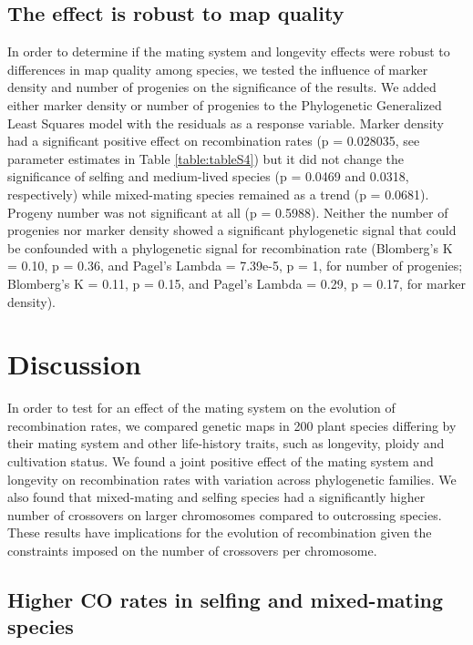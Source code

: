 \documentclass{article}
\begin{document}
\subsection*{The effect is robust to map quality}


In order to determine if the mating system and longevity effects were robust to differences in map quality among species, we tested the influence of marker density and number of progenies on the significance of the results. We added either marker density or number of progenies to the Phylogenetic Generalized Least Squares model with the residuals as a response variable. Marker density had a significant positive effect on recombination rates (p = 0.028035, see parameter estimates in Table \ref{table:tableS4}) but it did not change the significance of selfing and medium-lived species (p = 0.0469 and 0.0318, respectively) while mixed-mating species remained as a trend (p = 0.0681). Progeny number was not significant at all (p = 0.5988). Neither the number of progenies nor marker density showed a significant phylogenetic signal that could be confounded with a phylogenetic signal for recombination rate (Blomberg’s K = 0.10, p = 0.36, and Pagel’s Lambda = 7.39e-5, p = 1, for number of progenies; Blomberg’s K = 0.11, p = 0.15, and Pagel’s Lambda = 0.29, p = 0.17, for marker density).


\section*{Discussion}

In order to test for an effect of the mating system on the evolution of recombination rates, we compared genetic maps in 200 plant species differing by their mating system and other life-history traits, such as longevity, ploidy and cultivation status. We found a joint positive effect of the mating system and longevity on recombination rates with variation across phylogenetic families. We also found that mixed-mating and selfing species had a significantly higher number of crossovers on larger chromosomes compared to outcrossing species. These results have implications for the evolution of recombination given the constraints imposed on the number of crossovers per chromosome.


\subsection*{Higher CO rates in selfing and mixed-mating species}
\end{document}
